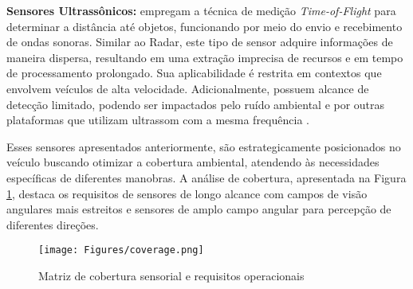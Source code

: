 \textbf{Sensores Ultrassônicos:} empregam a técnica de medição \textit{Time-of-Flight} para determinar a distância até objetos, funcionando por meio do envio e recebimento de ondas sonoras. Similar ao Radar, este tipo de sensor adquire informações de maneira dispersa, resultando em uma extração imprecisa de recursos e em tempo de processamento prolongado. Sua aplicabilidade é restrita em contextos que envolvem veículos de alta velocidade. Adicionalmente, possuem alcance de detecção limitado, podendo ser impactados pelo ruído ambiental e por outras plataformas que utilizam ultrassom com a mesma frequência \cite[p. ~8]{zheng2023simultaneous}.



Esses sensores apresentados anteriormente, são estrategicamente posicionados no veículo buscando otimizar a cobertura ambiental, atendendo às necessidades específicas de diferentes manobras. A análise de cobertura, apresentada na Figura \ref{coverage}, destaca os requisitos de sensores de longo alcance com campos de visão angulares mais estreitos e sensores de amplo campo angular para percepção de diferentes direções.

\begin{figure}[H]
\centering
\texttt{[image: Figures/coverage.png]}
\caption{Matriz de cobertura sensorial e requisitos operacionais \cite[Week 2 - Lesson 2: Hardware Configuration Design. ~9min00s]{University_of_Toronto2018-fe}}
\label{coverage}
\end{figure}

